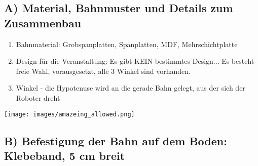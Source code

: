 \documentclass[a4paper,12pt]{article}
\begin{document}
\subsection{A) Material, Bahnmuster und Details zum Zusammenbau}
\begin{enumerate}
	\item Bahnmaterial: Grobspanplatten, Spanplatten, MDF,
		Mehrschichtplatte
	\item Design für die Veranstaltung: Es gibt KEIN bestimmtes Design...
		Es besteht freie Wahl, vorausgesetzt, alle 3 Winkel sind
		vorhanden.
	\item Winkel - die Hypotenuse wird an die gerade Bahn gelegt, aus der
		sich der Roboter dreht
\end{enumerate}

\texttt{[image: images/amazeing\_allowed.png]}

\subsection{B) Befestigung der Bahn auf dem Boden: Klebeband, 5 cm breit}
\end{document}
